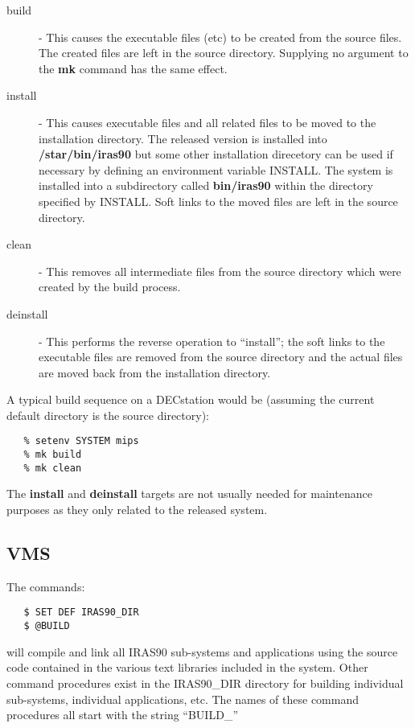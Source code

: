 \begin{description}
\item [build] - This causes the executable files (etc) to be created from the
source files. The created files are left in the source directory. Supplying no
argument to the {\bf mk} command has the same effect.

\item [install] - This causes executable files and all related files to be moved
to the installation directory. The released version is installed into {\bf
/star/bin/iras90} but some other installation direcetory can be used if
necessary by defining an environment variable {\small INSTALL}. The system is
installed into a subdirectory called {\bf bin/iras90} within the directory
specified by {\small INSTALL}. Soft links to the moved files are left in the
source directory.

\item [clean] - This removes all intermediate files from the source directory
which were created by the build process.

\item [deinstall] - This performs the reverse operation to ``install''; the soft
links to the executable files are removed from the source directory and the
actual files are moved back from the installation directory.

\end{description}

A typical build sequence on a DECstation would be (assuming the current default
directory is the source directory):

\small
\begin{verbatim}
   % setenv SYSTEM mips
   % mk build
   % mk clean
\end{verbatim}
\normalsize

The {\bf install} and {\bf deinstall} targets are not usually needed for
maintenance purposes as they only related to the released system.


\subsection{VMS}
The commands:

\small
\begin{verbatim}
   $ SET DEF IRAS90_DIR
   $ @BUILD
\end{verbatim}
\normalsize

will compile and link all {\small IRAS90} sub-systems and applications using the
source code contained in the various text libraries included in the system.
Other command procedures exist in the {\small IRAS90\_DIR} directory for
building individual sub-systems, individual applications, etc. The names of
these command procedures all start with the string ``{\small BUILD\_}''


